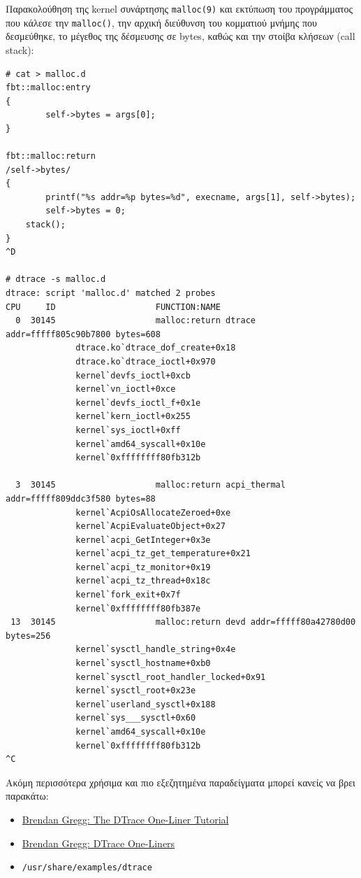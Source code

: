 \documentclass[12pt]{article}
\begin{document}
Παρακολούθηση της kernel συνάρτησης \lstinline{malloc(9)} και εκτύπωση του
προγράμματος που κάλεσε την \lstinline{malloc()}, την αρχική διεύθυνση του
κομματιού μνήμης που δεσμεύθηκε, το μέγεθος της δέσμευσης σε bytes, καθώς και
την στοίβα κλήσεων (call stack):

\begin{lstlisting}
# cat > malloc.d
fbt::malloc:entry
{
        self->bytes = args[0];
}

fbt::malloc:return
/self->bytes/
{
        printf("%s addr=%p bytes=%d", execname, args[1], self->bytes);
        self->bytes = 0;
	stack();
}
^D

# dtrace -s malloc.d
dtrace: script 'malloc.d' matched 2 probes
CPU     ID                    FUNCTION:NAME
  0  30145                    malloc:return dtrace addr=fffff805c90b7800 bytes=608
              dtrace.ko`dtrace_dof_create+0x18
              dtrace.ko`dtrace_ioctl+0x970
              kernel`devfs_ioctl+0xcb
              kernel`vn_ioctl+0xce
              kernel`devfs_ioctl_f+0x1e
              kernel`kern_ioctl+0x255
              kernel`sys_ioctl+0xff
              kernel`amd64_syscall+0x10e
              kernel`0xffffffff80fb312b

  3  30145                    malloc:return acpi_thermal addr=fffff809ddc3f580 bytes=88
              kernel`AcpiOsAllocateZeroed+0xe
              kernel`AcpiEvaluateObject+0x27
              kernel`acpi_GetInteger+0x3e
              kernel`acpi_tz_get_temperature+0x21
              kernel`acpi_tz_monitor+0x19
              kernel`acpi_tz_thread+0x18c
              kernel`fork_exit+0x7f
              kernel`0xffffffff80fb387e
 13  30145                    malloc:return devd addr=fffff80a42780d00 bytes=256
              kernel`sysctl_handle_string+0x4e
              kernel`sysctl_hostname+0xb0
              kernel`sysctl_root_handler_locked+0x91
              kernel`sysctl_root+0x23e
              kernel`userland_sysctl+0x188
              kernel`sys___sysctl+0x60
              kernel`amd64_syscall+0x10e
              kernel`0xffffffff80fb312b
^C
\end{lstlisting}

Ακόμη περισσότερα χρήσιμα και πιο εξεζητημένα παραδείγματα μπορεί κανείς να
βρει παρακάτω:

\begin{itemize}
	\item \href{https://www.brendangregg.com/Articles/FreeBSDwiki\_DTrace\_Tutorial\_2014.pdf}
		{Brendan Gregg: The DTrace One-Liner Tutorial}
	\item \href{https://www.brendangregg.com/DTrace/dtrace\_oneliners.txt}
		{Brendan Gregg: DTrace One-Liners}
	\item \lstinline{/usr/share/examples/dtrace}
\end{itemize}
\end{document}
